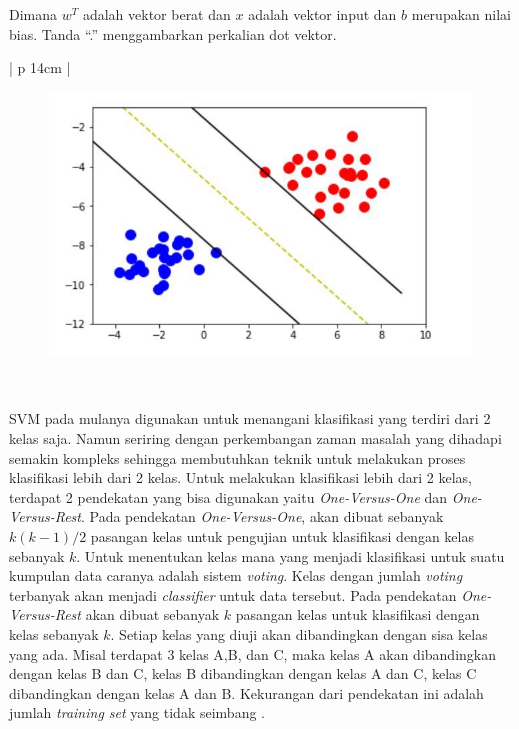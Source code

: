 \noindent Dimana $w^T$ adalah vektor berat dan $x$ adalah vektor input dan $b$ merupakan nilai bias. Tanda “.” menggambarkan perkalian dot vektor.
\begin{table}[H]
	\small
	\begin{adjustbox}{width=1\textwidth}
		\begin{tabular}{| p {14cm} |}
			\hline
			\begin{figure}[H]
				\centering
				\includegraphics[width=14cm]{images/svm.jpeg}
			\end{figure} \\
			\hline
		\end{tabular}
	\end{adjustbox}
	\label{fig:hyperplanesvm}
\end{table}

\noindent SVM pada mulanya digunakan untuk menangani klasifikasi yang terdiri dari 2 kelas saja. Namun seriring dengan perkembangan zaman masalah yang dihadapi semakin kompleks sehingga membutuhkan teknik untuk melakukan proses klasifikasi lebih dari 2 kelas. Untuk melakukan klasifikasi lebih dari 2 kelas, terdapat 2 pendekatan yang bisa digunakan yaitu \textit{One-Versus-One} dan \textit{One-Versus-Rest}. Pada pendekatan \textit{One-Versus-One}, akan dibuat sebanyak $k(k-1)/2$  pasangan kelas untuk pengujian untuk klasifikasi dengan kelas sebanyak $k$. Untuk menentukan kelas mana yang menjadi klasifikasi untuk suatu kumpulan data caranya adalah sistem \textit{voting}. Kelas dengan jumlah \textit{voting} terbanyak akan menjadi \textit{classifier} untuk data tersebut. Pada pendekatan \textit{One-Versus-Rest} akan dibuat sebanyak $k$ pasangan kelas untuk klasifikasi dengan kelas sebanyak $k$. Setiap kelas yang diuji akan dibandingkan dengan sisa kelas yang ada. Misal terdapat 3 kelas A,B, dan C, maka kelas A akan dibandingkan dengan kelas B dan C, kelas B dibandingkan dengan kelas A dan C, kelas C dibandingkan dengan kelas A dan B. Kekurangan dari pendekatan ini adalah jumlah \textit{training set} yang tidak seimbang \cite{svm}.

